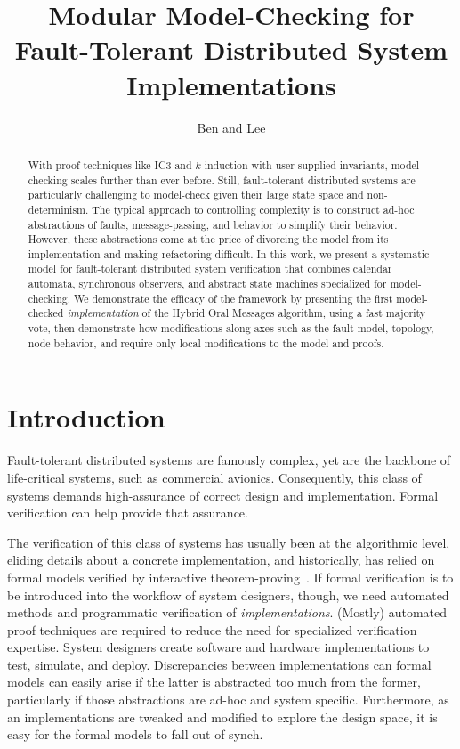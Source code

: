 \documentclass{llncs/llncs}
\newcommand{\lee}[1]{ } %
\newcommand{\lee}[1]{ {\color{blue}$<$lee: #1$>$} } %
\begin{document}
\title{Modular Model-Checking for Fault-Tolerant Distributed System Implementations}
\author{Ben and Lee}


\maketitle


\begin{abstract}
With proof techniques like IC3 and $k$-induction with user-supplied invariants, model-checking scales further than ever before. Still, fault-tolerant distributed systems are particularly challenging to model-check given their large state space and non-determinism. The typical approach to controlling complexity is to construct ad-hoc abstractions of faults, message-passing, and behavior to simplify their behavior. However, these abstractions come at the price of divorcing the model from its implementation and making refactoring difficult. In this work, we present a systematic model for fault-tolerant distributed system verification that combines calendar automata, synchronous observers, and abstract state machines specialized for model-checking. We demonstrate the efficacy of the framework by presenting the first model-checked \emph{implementation} of the Hybrid Oral Messages algorithm, using a fast majority vote, then demonstrate how modifications along axes such as the fault model, topology, node behavior, and require only local modifications to the model and proofs.
\end{abstract}

\section{Introduction}

\lee{talk about Amazon/TLA? Paxos made live?}

Fault-tolerant distributed systems are famously complex, yet are the backbone of life-critical systems, such as commercial avionics. Consequently, this class of systems demands high-assurance of correct design and implementation. Formal verification can help provide that assurance.

The verification of this class of systems has usually been at the algorithmic level, eliding details about a concrete implementation, and historically, has relied on formal models verified by interactive theorem-proving~\cite{om-acl2-impl,Young97:IC,csl-93-2,pvs}. If formal verification is to be introduced into the workflow of system designers, though, we need automated methods and programmatic verification of \emph{implementations}. (Mostly) automated proof techniques are required to reduce the need for specialized verification expertise. System designers create software and hardware implementations to test, simulate, and deploy. Discrepancies between implementations can formal models can easily arise if the latter is abstracted too much from the former, particularly if those abstractions are ad-hoc and system specific. Furthermore, as an implementations are tweaked and modified to explore the design space, it is easy for the formal models to fall out of synch.
\end{document}
